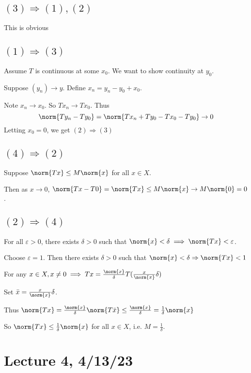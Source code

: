 \documentclass[x11names,reqno,14pt]{extarticle}
\begin{document}
\proof\,

\subsection*{$(3)\Rightarrow (1),(2)$}

This is obvious

\subsection*{$(1)\Rightarrow(3)$}

Assume $T$ is continuous at some $x_0$. We want to show continuity at $y_0$. 

Suppose $(y_n)\to y$. Define $x_n = y_n - y_0 + x_0$. 

Note $x_n \to x_0$. So $Tx_n \to Tx_0$. Thus
\[
\norm{Ty_n - Ty_0} = \norm{Tx_n + Ty_0 - Tx_0 - Ty_0} \to 0
\]
Letting $x_0 = 0$, we get $(2)\Rightarrow(3)$

\subsection*{$(4)\Rightarrow(2)$}

Suppose $\norm{Tx} \leq M\norm{x}$ for all $x \in X$. 

Then as $x \to 0$, $\norm{Tx - T0} = \norm{Tx} \leq M\norm{x} \to M\norm{0} = 0$. 

\subsection*{$(2)\Rightarrow(4)$}

For all $\varepsilon>0$, there exists $\delta>0$ such that $\norm{x}<\delta\implies \norm{Tx}<\varepsilon$. 

Choose $\varepsilon = 1$. Then there exists $\delta>0$ such that $\norm{x} < \delta \Rightarrow \norm{Tx} < 1$

For any $x \in X, x\neq 0 \implies Tx = \frac{\norm{x}}{\delta}T(\frac{x}{\norm{x}}\delta)$

Set $\bar{x} = \frac{x}{\norm{x}} \delta$. 

Thus $\norm{Tx} = \frac{\norm{x}}{\delta}\norm{T\bar{x}} \leq \frac{\norm{x}}{\delta} = \frac{1}{\delta}\norm{x}$

So $\norm{Tx} \leq \frac{1}{\delta}\norm{x}$ for all $x \in X$, i.e. $M = \frac{1}{\delta}$.

\section*{Lecture 4, 4/13/23}
\end{document}
